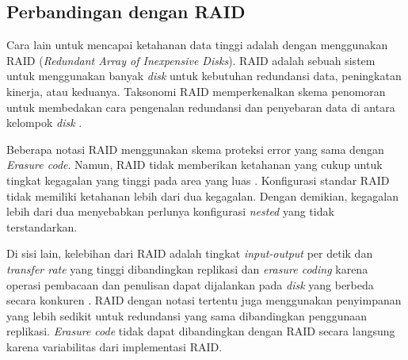\subsection{Perbandingan dengan RAID}
\label{sec:perbedaan-dengan-raid}

Cara lain untuk mencapai ketahanan data tinggi adalah dengan menggunakan RAID (\textit{Redundant Array of Inexpensive Disks}). RAID adalah sebuah sistem untuk menggunakan banyak \textit{disk} untuk kebutuhan redundansi data, peningkatan kinerja, atau keduanya. Taksonomi RAID memperkenalkan skema penomoran untuk membedakan cara pengenalan redundansi dan penyebaran data di antara kelompok \textit{disk} \parencite{katz2010raid}.


Beberapa notasi RAID menggunakan skema proteksi error yang sama dengan \textit{Erasure code}. Namun, RAID tidak memberikan ketahanan yang cukup untuk tingkat kegagalan yang tinggi pada area yang luas \parencite{weatherspoon2002erasure}. Konfigurasi standar RAID tidak memiliki ketahanan lebih dari dua kegagalan. Dengan demikian, kegagalan lebih dari dua menyebabkan perlunya konfigurasi \textit{nested} yang tidak terstandarkan.

Di sisi lain, kelebihan dari RAID adalah tingkat \textit{input-output} per detik dan \textit{transfer rate} yang tinggi dibandingkan replikasi dan \textit{erasure coding} karena operasi pembacaan dan penulisan dapat dijalankan pada \textit{disk} yang berbeda secara konkuren \parencite{katz2010raid}. RAID dengan notasi tertentu juga menggunakan penyimpanan yang lebih sedikit untuk redundansi yang sama dibandingkan penggunaan replikasi. \textit{Erasure code} tidak dapat dibandingkan dengan RAID secara langsung karena variabilitas dari implementasi RAID.
